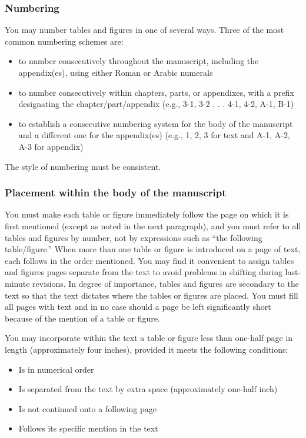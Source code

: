 \subsubsection{Numbering}
\label{sec:Numbering}

You may number tables and figures in one of several ways. Three of the
most common numbering schemes are:
\begin{itemize}
\item to number consecutively throughout the manuscript, including the
  appendix(es), using either Roman or Arabic numerals
\item to number consecutively within chapters, parts, or appendixes,
  with a prefix designating the chapter/part/appendix (e.g., 3-1, 3-2
  . . . 4-1, 4-2, A-1, B-1)
\item to establish a consecutive numbering system for the body of the
  manuscript and a different one for the appendix(es) (e.g., 1, 2, 3
  for text and A-1, A-2, A-3 for appendix)
\end{itemize}
The style of numbering must be consistent.

\subsubsection{Placement within the body of the manuscript}
\label{sec:PlacementWithinTheBodyOfTheManuscript}

You must make each table or figure immediately follow the page on
which it is first mentioned (except as noted in the next paragraph),
and you must refer to all tables and figures by number, not by
expressions such as ``the following table/figure.'' When more than one
table or figure is introduced on a page of text, each follows in the
order mentioned. You may find it convenient to assign tables and
figures pages separate from the text to avoid problems in shifting
during last-minute revisions. In degree of importance, tables and
figures are secondary to the text so that the text dictates where the
tables or figures are placed. You must fill all pages with text and in
no case should a page be left significantly short because of the
mention of a table or figure.

You may incorporate within the text a table or figure less than
one-half page in length (approximately four inches), provided it meets
the following conditions:
\begin{itemize}
\item Is in numerical order
\item Is separated from the text by extra space (approximately one-half inch)
\item Is not continued onto a following page
\item Follows its specific mention in the text
\end{itemize}

